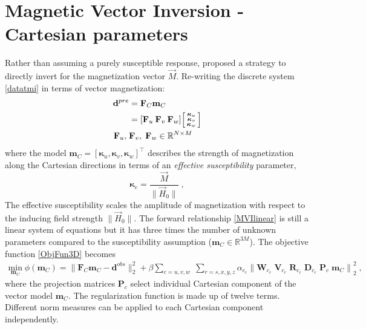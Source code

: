 \section{Magnetic Vector Inversion - Cartesian parameters}
Rather than assuming a purely susceptible response, \cite{LelievreOldenburg2009}
proposed a strategy to directly invert for the magnetization vector $\vec M$.
Re-writing the discrete system \eqref{datatmi} in terms of vector magnetization:
\begin{equation}\label{MVIlinear}
\begin{split}
\mathbf{d}^{pre} &= \mathbf{F}_{C} \mathbf{m}_C \\
&= [ \mathbf{F}_u \: \mathbf{F}_v \: \mathbf{F}_w]
\begin{bsmallmatrix}
\boldsymbol{\kappa}_{u}\\
\boldsymbol{\kappa}_{v}\\
\boldsymbol{\kappa}_{w}
\end{bsmallmatrix} \\
\mathbf{F}_u,\; &\mathbf{F}_v, \;\mathbf{F}_w \in \mathbb{R}^{N \times M}
\end{split}
\end{equation}
where the model $\mathbf{m}_C = [\boldsymbol{\kappa}_{u}, \boldsymbol{\kappa}_{v}, \boldsymbol{\kappa}_{w}]^\top$ describes the strength of magnetization along the Cartesian directions in terms of an \emph{effective susceptibility} parameter,
\begin{equation}
\boldsymbol{\kappa}_e = \frac{\vec M}{\|\vec H_0\|} \;,
\end{equation}
The effective susceptibility scales the amplitude of magnetization with respect to the inducing field strength $\|\vec {H}_0\|$.
The forward relationship \eqref{MVIlinear} is still a linear system of equations but it has three times the number of unknown parameters compared to the susceptibility assumption ($\mathbf{m}_C \in \mathbb{R}^{3M}$). The objective function \eqref{ObjFun3D} becomes
\begin{equation} \label{phi_m_sparse_3C}
\begin{split}
\underset{\mathbf{m}_C}{\text{min}}\; \phi(\mathbf{m}_C) = \|\mathbf{F}_{C} \mathbf{m}_C - \mathbf{d}^{obs}\|_2^2 + \beta \sum_{c = u,v,w} \;
\sum_{r = s,x,y,z} \alpha_{c_r} {\|\mathbf{W}_{c_r}\; \mathbf{V}_{c_r} \;\mathbf{R}_{c_r} \; \mathbf{D}_{c_r} \;\mathbf{P}_{c} \; \mathbf{m}_C\|}^2_2 \;,
\end{split}
\end{equation}
where the projection matrices $\mathbf{P}_{c}$ select individual Cartesian component of the vector model $\mathbf{m}_C$. The regularization function is made up of twelve terms. Different norm measures can be applied to each Cartesian component independently.

